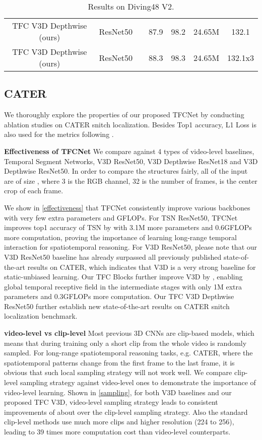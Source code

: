 \documentclass[nohyperref]{article}
\theoremstyle{plain}
\theoremstyle{definition}
\theoremstyle{remark}
\begin{document}
{{\begin{table*}[!htb]
\begin{center}
\begin{tabular}{c|c|c|c|c|c|c}
TFC V3D Depthwise (ours) & {ResNet50} & {} & 87.9 &98.2 &24.65M&132.1\\
TFC V3D Depthwise (ours) & {ResNet50} & {} & 88.3 & 98.3&24.65M&132.1x3\\
\hline
\end{tabular}
\end{center}
\vspace{-5mm}
\caption{Results on Diving48 V2.}
\label{diving48 v2}
\end{table*}
\subsection{CATER}
We thoroughly explore the properties of our proposed TFCNet by conducting ablation studies on CATER snitch localization\cite{Girdhar2020CATER:}. Besides Top1 accuracy, L1 Loss is also used for the metrics following \cite{Girdhar2020CATER:}.


{\bf Effectiveness of TFCNet} We compare against 4 types of video-level baselines, Temporal Segment Networks, V3D ResNet50, V3D Depthwise ResNet18 and V3D Depthwise ResNet50. In order to compare the structures fairly, all of the input are of size , where 3 is the RGB channel, 32 is the number of frames,  is the center crop of each frame. 

We show in \cref{effectiveness} that TFCNet consistently improve various backbones with very few extra parameters and GFLOPs. For TSN ResNet50, TFCNet improves top1 accuracy of TSN by  with 3.1M more parameters and 0.6GFLOPs more computation, proving the importance of learning long-range temporal interaction for spatiotemporal reasoning. For V3D ResNet50, please note that our V3D ResNet50 baseline has already surpassed all previously published state-of-the-art results on CATER\cite{Girdhar2020CATER:}, which indicates that V3D is a very strong baseline for static-unbiased learning. Our TFC Blocks further improve V3D by , enabling global temporal receptive field in the intermediate stages with only 1M extra parameters and 0.3GFLOPs more computation.  Our TFC V3D Depthwise ResNet50 further establish new state-of-the-art results  on CATER snitch localization benchmark.



{\bf video-level vs clip-level } Most previous 3D CNNs are clip-based models, which means that during training only a short clip from the whole video is randomly sampled. For long-range spatiotemporal reasoning tasks, e.g. CATER, where the spatiotemporal patterns change from the first frame to the last frame, it is obvious that such local sampling strategy will not work well. We compare clip-level sampling strategy against video-level ones to demonstrate the importance of video-level learning. Shown in \cref{sampling}, for both V3D baselines and our proposed TFC V3D, video-level sampling strategy leads to consistent improvements of about  over the clip-level sampling strategy. Also the standard clip-level methods use much more clips and higher resolution (224 to 256), leading to 39 times more computation cost than video-level counterparts. 


}}
\end{document}

